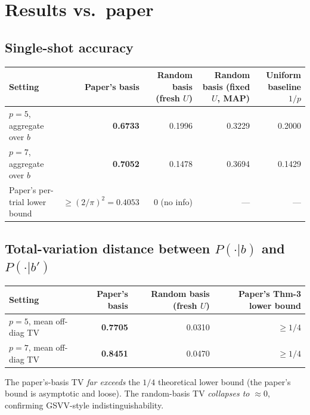 \documentclass[11pt]{article}
\begin{document}
\section{Results vs.\ paper}

\subsection{Single-shot accuracy}
\begin{center}
\small
\begin{tabular}{@{}l r r r r@{}}
\toprule
Setting & Paper's basis & Random basis (fresh $U$) & Random basis (fixed $U$, MAP) & Uniform baseline $1/p$ \\
\midrule
$p=5$, aggregate over $b$ & \textbf{0.6733} & 0.1996 & 0.3229 & 0.2000 \\
$p=7$, aggregate over $b$ & \textbf{0.7052} & 0.1478 & 0.3694 & 0.1429 \\
Paper's per-trial lower bound & $\ge(2/\pi)^2=0.4053$ & 0 (no info) & --- & --- \\
\bottomrule
\end{tabular}
\end{center}

\subsection{Total-variation distance between $P(\cdot|b)$ and $P(\cdot|b')$}
\begin{center}
\small
\begin{tabular}{@{}l r r r@{}}
\toprule
Setting & Paper's basis & Random basis (fresh $U$) & Paper's Thm-3 lower bound \\
\midrule
$p=5$, mean off-diag TV & \textbf{0.7705} & 0.0310 & $\ge 1/4$ \\
$p=7$, mean off-diag TV & \textbf{0.8451} & 0.0470 & $\ge 1/4$ \\
\bottomrule
\end{tabular}
\end{center}

The paper's-basis TV \emph{far exceeds} the $1/4$ theoretical lower bound
(the paper's bound is asymptotic and loose). The random-basis TV
\emph{collapses to $\approx 0$}, confirming GSVV-style indistinguishability.
\end{document}
